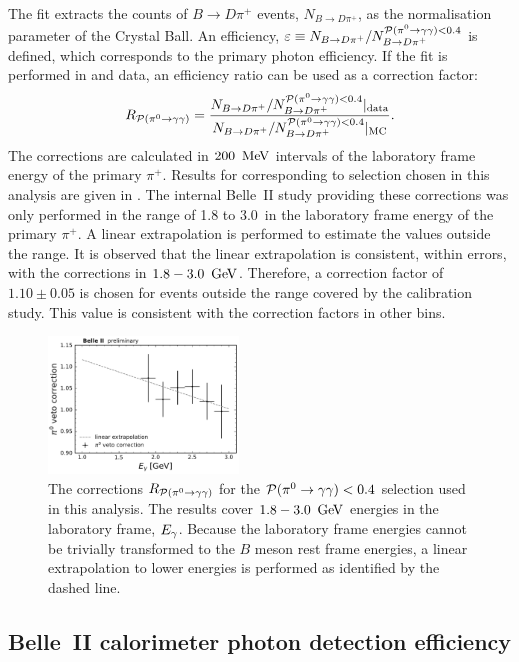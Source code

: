 The fit extracts the counts of $B\to D\pi^+$ events, $N_{B\to D\pi^+}$, as the normalisation parameter of the Crystal Ball.
An efficiency, $\varepsilon\equiv N_{B\rightarrow D\pi^+}/N^{{\mathcal{P}(\pi^0\rightarrow\gamma\gamma)}<0.4}_{B\rightarrow D\pi^+}$ is defined, which corresponds to the primary photon efficiency.
If the fit is performed in \MC and data, an efficiency ratio can be used as a correction factor:
\begin{equation}\label{eq:piveto_correction}
    R_{{\mathcal{P}(\pi^0\rightarrow\gamma\gamma)}} = \frac{N_{B\rightarrow D\pi^+}/N^{{\mathcal{P}(\pi^0\rightarrow\gamma\gamma)}<0.4}_{B\rightarrow D\pi^+}|_{\mathrm{data}}}{N_{B\rightarrow D\pi^+}/N^{{\mathcal{P}(\pi^0\rightarrow\gamma\gamma)}<0.4}_{B\rightarrow D\pi^+}|_{\mathrm{MC}}}.
\end{equation}
The corrections are calculated in $200~\mathrm{\,Me\kern -0.1em V}$ intervals of the laboratory frame energy of the primary $\pi^+$.
Results for corresponding to selection chosen in this analysis are given in .
The internal Belle~II study providing these corrections was only performed in the range of 1.8 to 3.0~\gev in the laboratory frame energy of the primary $\pi^+$.
A linear extrapolation is performed to estimate the values outside the range.
It is observed that the linear extrapolation is consistent, within errors, with the corrections in $1.8-3.0~\mathrm{\,Ge\kern -0.1em V}$.
Therefore, a correction factor of $1.10\pm0.05$ is chosen for events outside the range covered by the calibration study.
This value is consistent with the correction factors in other \Egamma bins.
\begin{figure}[hbtp!]
    \centering
    \includegraphics[width=0.45\textwidth]{figures/data_sim_corrections/pi0veto_corrections.pdf}
    \caption{\label{fig:piveto_corrections} The corrections $R_{{\mathcal{P}(\pi^0\rightarrow\gamma\gamma)}}$ for the ${\mathcal{P}(\pi^0\rightarrow\gamma\gamma)}<0.4$ selection used in this analysis.
    The results cover $1.8-3.0~\mathrm{\,Ge\kern -0.1em V}$ energies in the laboratory frame, ${E_{\gamma}}$.
    Because the laboratory frame energies cannot be trivially transformed to the $B$ meson rest frame energies, a linear extrapolation to lower energies is performed as identified by the dashed line.
    }
\end{figure}

\subsection{Belle~II calorimeter photon detection efficiency}\label{sec:photon_efficiency}

